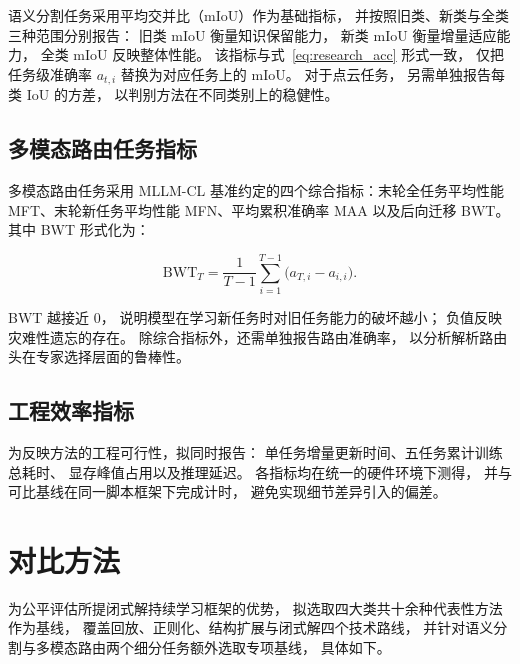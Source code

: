 语义分割任务采用平均交并比（mIoU）作为基础指标，
并按照旧类、新类与全类三种范围分别报告：
旧类 mIoU 衡量知识保留能力，
新类 mIoU 衡量增量适应能力，
全类 mIoU 反映整体性能。
该指标与式~\eqref{eq:research_acc} 形式一致，
仅把任务级准确率 $a_{t,i}$ 替换为对应任务上的 mIoU。
对于点云任务，
另需单独报告每类 IoU 的方差，
以判别方法在不同类别上的稳健性。

\subsection{多模态路由任务指标}

多模态路由任务采用 MLLM-CL 基准约定的四个综合指标：末轮全任务平均性能 MFT、末轮新任务平均性能 MFN、平均累积准确率 MAA 以及后向迁移 BWT。其中 BWT 形式化为：

\begin{equation}
\label{eq:research_bwt}
\mathrm{BWT}_T = \frac{1}{T-1}\sum_{i=1}^{T-1}\bigl(a_{T,i} - a_{i,i}\bigr).
\end{equation}

BWT 越接近 0，
说明模型在学习新任务时对旧任务能力的破坏越小；
负值反映灾难性遗忘的存在。
除综合指标外，还需单独报告路由准确率，
以分析解析路由头在专家选择层面的鲁棒性。


\subsection{工程效率指标}

为反映方法的工程可行性，拟同时报告：
单任务增量更新时间、五任务累计训练总耗时、
显存峰值占用以及推理延迟。
各指标均在统一的硬件环境下测得，
并与可比基线在同一脚本框架下完成计时，
避免实现细节差异引入的偏差。


\section{对比方法}

为公平评估所提闭式解持续学习框架的优势，
拟选取四大类共十余种代表性方法作为基线，
覆盖回放、正则化、结构扩展与闭式解四个技术路线，
并针对语义分割与多模态路由两个细分任务额外选取专项基线，
具体如下。

